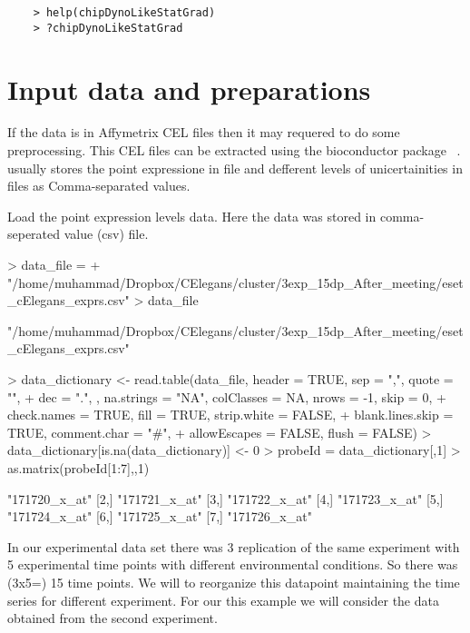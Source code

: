 \documentclass{article}
\begin{document}
\begin{verbatim}
    > help(chipDynoLikeStatGrad)
    > ?chipDynoLikeStatGrad
\end{verbatim}

\section{Input data and preparations}
If the data is in Affymetrix CEL files then it may requered to do some preprocessing. This CEL files can be extracted using the bioconductor package  ~\cite{puma}.  usually stores the point expressione in  file and defferent levels of unicertainities in  files as Comma-separated values.

Load the point expression levels data. Here the data was stored in comma-seperated value (csv) file.

\begin{Schunk}
\begin{Sinput}
> data_file = 
+   "/home/muhammad/Dropbox/CElegans/cluster/3exp_15dp_After_meeting/eset_cElegans_exprs.csv"
> data_file
\end{Sinput}
\begin{Soutput}
[1] "/home/muhammad/Dropbox/CElegans/cluster/3exp_15dp_After_meeting/eset_cElegans_exprs.csv"
\end{Soutput}
\begin{Sinput}
> data_dictionary <- read.table(data_file, header = TRUE, sep = ",", quote = "", 
+                     dec = ".", , na.strings = "NA", colClasses = NA, nrows = -1, skip = 0, 
+                     check.names = TRUE, fill = TRUE, strip.white = FALSE,  
+                     blank.lines.skip = TRUE, comment.char = "#", 
+                     allowEscapes = FALSE, flush = FALSE)
> data_dictionary[is.na(data_dictionary)] <- 0
> probeId = data_dictionary[,1]
> as.matrix(probeId[1:7],,1)
\end{Sinput}
\begin{Soutput}
     [,1]         
[1,] "171720_x_at"
[2,] "171721_x_at"
[3,] "171722_x_at"
[4,] "171723_x_at"
[5,] "171724_x_at"
[6,] "171725_x_at"
[7,] "171726_x_at"
\end{Soutput}
\end{Schunk}

In our experimental data set there was 3 replication of the same experiment with 5 experimental time points with different environmental conditions. So there was (3x5=) 15 time points. We will to reorganize this datapoint maintaining the time series for different experiment. For our this example we will consider the data obtained from the second experiment.
\end{document}
